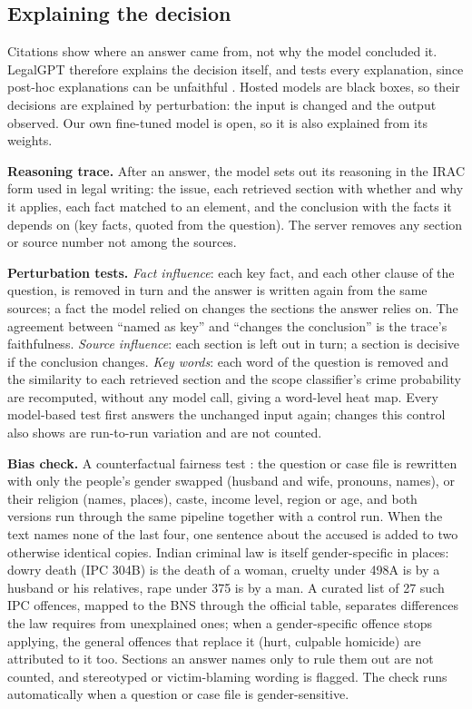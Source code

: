 \documentclass[conference]{IEEEtran}
\begin{document}
\subsection{Explaining the decision}\label{sec:xai}

Citations show where an answer came from, not why the model concluded it. LegalGPT therefore explains
the decision itself, and tests every explanation, since post-hoc explanations can be unfaithful
\cite{turpin2023unfaithful,jacovi2020faithfulness}. Hosted models are black boxes, so their decisions
are explained by perturbation: the input is changed and the output observed. Our own fine-tuned model
is open, so it is also explained from its weights.

\textbf{Reasoning trace.} After an answer, the model sets out its reasoning in the IRAC form used in
legal writing: the issue, each retrieved section with whether and why it applies, each fact matched to
an element, and the conclusion with the facts it depends on (key facts, quoted from the question). The
server removes any section or source number not among the sources.

\textbf{Perturbation tests.} \emph{Fact influence}: each key fact, and each other clause of the
question, is removed in turn and the answer is written again from the same sources; a fact the model
relied on changes the sections the answer relies on. The agreement between ``named as key'' and
``changes the conclusion'' is the trace's faithfulness. \emph{Source influence}: each section is left
out in turn; a section is decisive if the conclusion changes. \emph{Key words}: each word of the
question is removed and the similarity to each retrieved section and the scope classifier's crime
probability are recomputed, without any model call, giving a word-level heat map. Every model-based
test first answers the unchanged input again; changes this control also shows are run-to-run variation
and are not counted.

\textbf{Bias check.} A counterfactual fairness test \cite{kusner2017counterfactual}: the question or
case file is rewritten with only the people's gender swapped (husband and wife, pronouns, names), or
their religion (names, places), caste, income level, region or age, and both versions run through the
same pipeline together with a control run. When the text names none of the last four, one sentence
about the accused is added to two otherwise identical copies. Indian criminal law is itself gender-specific in places: dowry death (IPC 304B) is the
death of a woman, cruelty under 498A is by a husband or his relatives, rape under 375 is by a man. A
curated list of 27 such IPC offences, mapped to the BNS through the official table, separates
differences the law requires from unexplained ones; when a gender-specific offence stops applying,
the general offences that replace it (hurt, culpable homicide) are attributed to it too. Sections an
answer names only to rule them out are not counted, and stereotyped or victim-blaming wording is
flagged. The check runs automatically when a question or case file is gender-sensitive.
\end{document}
